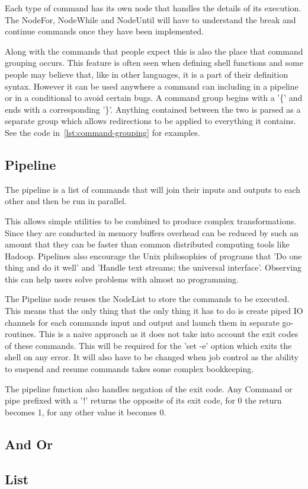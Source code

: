 Each type of command has its own node that handles the details of its execution.
The NodeFor, NodeWhile and NodeUntil will have to understand the break and continue commands once they have been implemented.

Along with the commands that people expect this is also the place that command grouping occurs.
This feature is often seen when defining shell functions and some people may believe that, like in other languages, it is a part of their definition syntax.
However it can be used anywhere a command can including in a pipeline or in a conditional to avoid certain bugs.
A command group begins with a '\{' and ends with a corresponding '\}'.
Anything contained between the two is parsed as a separate group which allows redirections to be applied to everything it contains.
See the code in~\ref{lst:command-grouping} for examples.

\subsection{Pipeline}
The pipeline is a list of commands that will join their inputs and outputs to each other and then be run in parallel.

This allows simple utilities to be combined to produce complex transformations.
Since they are conducted in memory buffers overhead can be reduced by such an amount that they can be faster than common distributed computing tools like Hadoop\cite{AdamD45:online}.
Pipelines also encourage the Unix philosophies of programs that 'Do one thing and do it well' and 'Handle text streams; the universal interface'.
Observing this can help users solve problems with almost no programming\cite{LITERATE-VS-SHELL}.

The Pipeline node reuses the NodeList to store the commands to be executed.
This means that the only thing that the only thing it has to do is create piped IO channels for each commands input and output and launch them in separate go-routines.
This is a naive approach as it does not take into account the exit codes of these commands.
This will be required for the 'set -e' option which exits the shell on any error.
It will also have to be changed when job control as the ability to suspend and resume commands takes some complex bookkeeping.


The pipeline function also handles negation of the exit code.
Any Command or pipe prefixed with a '!' returns the opposite of its exit code, for 0 the return becomes 1, for any other value it becomes 0.

\subsection{And Or}


\subsection{List}













